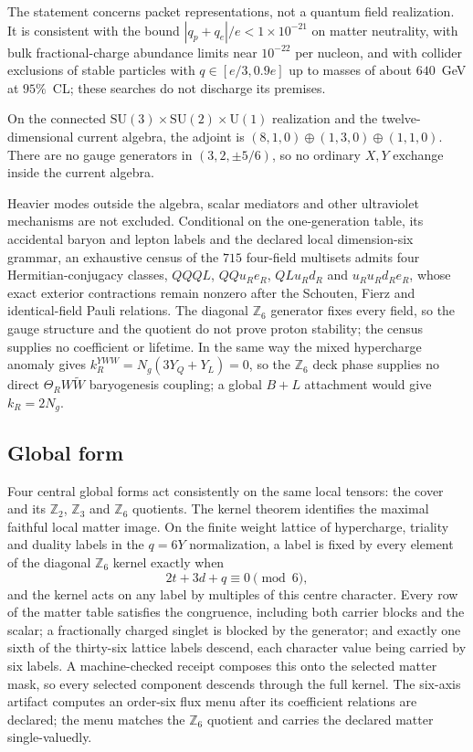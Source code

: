 \documentclass[11pt]{article}
\begin{document}
The statement concerns packet representations, not a quantum field
realization. It is consistent with the bound \(|q_p+q_e|/e<1\times10^{-21}\)
on matter neutrality, with bulk fractional-charge abundance limits near
\(10^{-22}\) per nucleon, and with collider exclusions of stable particles
with \(q\in[e/3,0.9e]\) up to masses of about \(640\)~GeV at \(95\%\)~CL; these
searches do not discharge its premises.

\begin{corollary}
On the connected \(\mathrm{SU}(3)\times\mathrm{SU}(2)\times\mathrm U(1)\)
realization and the twelve-dimensional current algebra, the adjoint is
\((8,1,0)\oplus(1,3,0)\oplus(1,1,0)\). There are no gauge generators in
\((3,2,\pm5/6)\), so no ordinary \(X,Y\) exchange inside the current algebra.
\end{corollary}

Heavier modes outside the algebra, scalar mediators and other ultraviolet
mechanisms are not excluded. Conditional on the one-generation table, its
accidental baryon and lepton labels and the declared local dimension-six
grammar, an exhaustive census of the \(715\) four-field multisets admits four
Hermitian-conjugacy classes, \(QQQL\), \(QQu_Re_R\), \(QLu_Rd_R\) and
\(u_Ru_Rd_Re_R\), whose exact exterior contractions remain nonzero after the
Schouten, Fierz and identical-field Pauli relations. The diagonal
\(\mathbb Z_6\) generator fixes every field, so the gauge structure and the
quotient do not prove proton stability; the census supplies no coefficient
or lifetime. In the same way the mixed hypercharge anomaly gives
\(k_R^{YWW}=N_g(3Y_Q+Y_L)=0\), so the \(\mathbb Z_6\) deck phase supplies no
direct \(\Theta_RW\widetilde W\) baryogenesis coupling; a global \(B+L\)
attachment would give \(k_R=2N_g\).

\subsection{Global form}
\label{sec:global-form}\label{thm:global-form-boundary}

Four central global forms act consistently on the same local tensors: the
cover and its \(\mathbb Z_2\), \(\mathbb Z_3\) and \(\mathbb Z_6\) quotients. The
kernel theorem identifies the maximal faithful local matter image. On the
finite weight lattice of hypercharge, triality and duality labels in the
\(q=6Y\) normalization, a label is fixed by every element of the diagonal
\(\mathbb Z_6\) kernel exactly when
\[
2t+3d+q\equiv0\pmod 6 ,
\]
and the kernel acts on any label by multiples of this centre character. Every
row of the matter table satisfies the congruence, including both carrier
blocks and the scalar; a fractionally charged singlet is blocked by the
generator; and exactly one sixth of the thirty-six lattice labels descend,
each character value being carried by six labels. A machine-checked receipt
composes this onto the selected matter mask, so every selected component
descends through the full kernel. The six-axis artifact computes an order-six
flux menu after its coefficient relations are declared; the menu matches the
\(\mathbb Z_6\) quotient and carries the declared matter single-valuedly.
\end{document}
